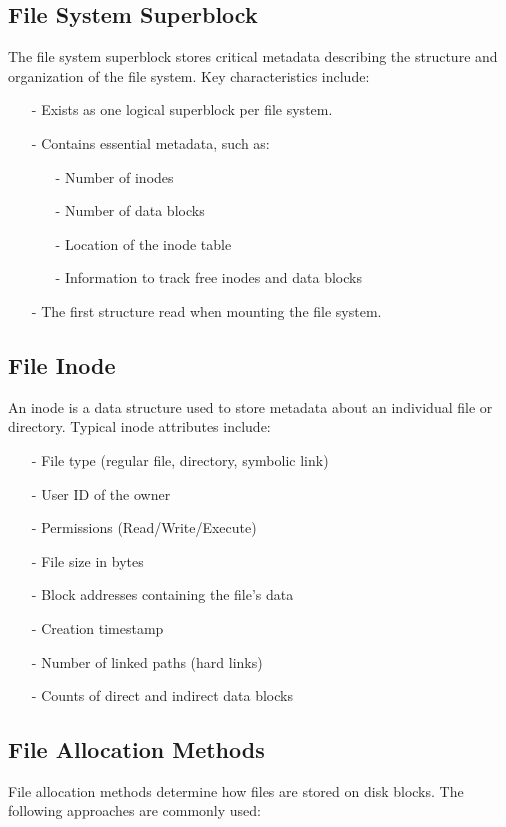 \subsection{File System Superblock}
The file system superblock stores critical metadata describing the structure and organization of the file system. Key characteristics include:
\begin{itemize}[itemsep=2pt, topsep=1pt]
    \item[-] Exists as one logical superblock per file system.
    \item[-] Contains essential metadata, such as:
    \begin{itemize}
        \item[-] Number of inodes
        \item[-] Number of data blocks
        \item[-] Location of the inode table
        \item[-] Information to track free inodes and data blocks
    \end{itemize}
    \item[-] The first structure read when mounting the file system.
\end{itemize}
\newpage
\subsection{File Inode}
An inode is a data structure used to store metadata about an individual file or directory. Typical inode attributes include:
\begin{itemize}[itemsep=2pt, topsep=1pt]
    \item[-] File type (regular file, directory, symbolic link)
    \item[-] User ID of the owner
    \item[-] Permissions (Read/Write/Execute)
    \item[-] File size in bytes
    \item[-] Block addresses containing the file's data
    \item[-] Creation timestamp
    \item[-] Number of linked paths (hard links)
    \item[-] Counts of direct and indirect data blocks
\end{itemize}

\subsection{File Allocation Methods}
File allocation methods determine how files are stored on disk blocks. The following approaches are commonly used:

